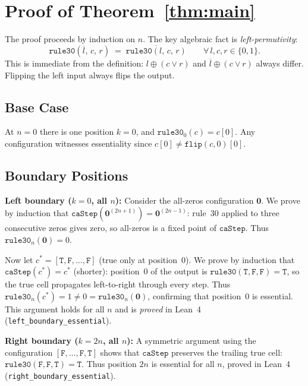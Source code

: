 \documentclass[11pt]{article}
\theoremstyle{plain}
\theoremstyle{definition}
\newcommand{\flip}[1]{\overline{#1}}
\begin{document}
\section{Proof of Theorem~\ref{thm:main}}
\label{sec:proof}

The proof proceeds by induction on $n$.  The key algebraic fact is
\emph{left-permutivity}:
\begin{equation}
  \label{eq:leftperm}
  \mathtt{rule30}(\flip{l},\, c,\, r)
  \;=\;
  \overline{\mathtt{rule30}(l,\, c,\, r)}
  \qquad \forall\, l, c, r \in \{0,1\}.
\end{equation}
This is immediate from the definition: $l \oplus (c \lor r)$ and
$\flip{l} \oplus (c \lor r)$ always differ.  Flipping the left input always flips
the output.

\subsection{Base Case}

At $n = 0$ there is one position $k = 0$, and $\mathtt{rule30}_0(c) = c[0]$.  Any
configuration witnesses essentiality since $c[0] \neq \mathtt{flip}(c, 0)[0]$.

\subsection{Boundary Positions}

\textbf{Left boundary ($k = 0$, all $n$):}
Consider the all-zeros configuration $\mathbf{0}$.  We prove by induction that
$\mathtt{caStep}(\mathbf{0}^{(2n+1)}) = \mathbf{0}^{(2n-1)}$: rule~30 applied to
three consecutive zeros gives zero, so all-zeros is a fixed point of
$\mathtt{caStep}$.  Thus $\mathtt{rule30}_n(\mathbf{0}) = 0$.

Now let $c^* = [\texttt{T}, \texttt{F}, \ldots, \texttt{F}]$ (true only at position~0).
We prove by induction that $\mathtt{caStep}(c^*) = c^*$ (shorter): position~0 of the
output is $\mathtt{rule30}(\texttt{T}, \texttt{F}, \texttt{F}) = \texttt{T}$, so the
true cell propagates left-to-right through every step.  Thus
$\mathtt{rule30}_n(c^*) = 1 \neq 0 = \mathtt{rule30}_n(\mathbf{0})$, confirming that
position~0 is essential.  This argument holds for all $n$ and is \emph{proved} in
Lean~4 (\texttt{left\_boundary\_essential}).

\textbf{Right boundary ($k = 2n$, all $n$):}
A symmetric argument using the configuration $[\texttt{F}, \ldots, \texttt{F},
\texttt{T}]$ shows that $\mathtt{caStep}$ preserves the trailing true cell:
$\mathtt{rule30}(\texttt{F}, \texttt{F}, \texttt{T}) = \texttt{T}$.  Thus position
$2n$ is essential for all $n$, proved in Lean~4
(\texttt{right\_boundary\_essential}).
\end{document}
